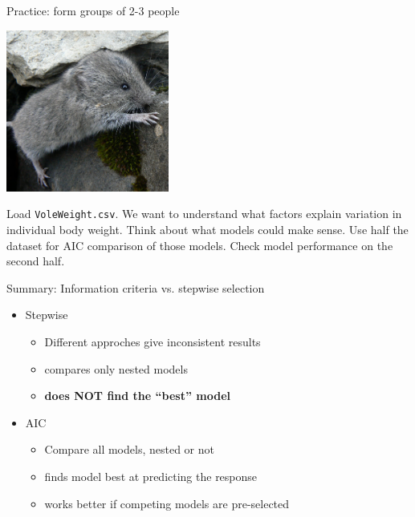 \documentclass[10pt]{beamer}\usepackage[]{graphicx}\usepackage[]{color}
\begin{document}
\begin{frame}{Practice: form groups of 2-3 people}

\begin{center}
  \includegraphics[width=0.4\textwidth]{Figures/vole}
\end{center}

Load \texttt{VoleWeight.csv}. We want to understand what factors explain variation in individual body weight. Think about what models could make sense. Use half the dataset for AIC comparison of those models. Check model performance on the second half.

\end{frame}

\begin{frame}{Summary: Information criteria vs. stepwise selection}
  \begin{exampleblock}{}
    \begin{itemize}[<+->]
      \item Stepwise 
        \begin{itemize}
          \item Different approches give inconsistent results
          \item compares only nested models
          \item \textbf{does NOT find the ``best'' model}
        \end{itemize}
      \item AIC 
        \begin{itemize}
          \item Compare all models, nested or not
          \item finds model best at predicting the response
          \item works better if competing models are pre-selected
        \end{itemize}
    \end{itemize}
  \end{exampleblock}
\end{frame}
\end{document}
